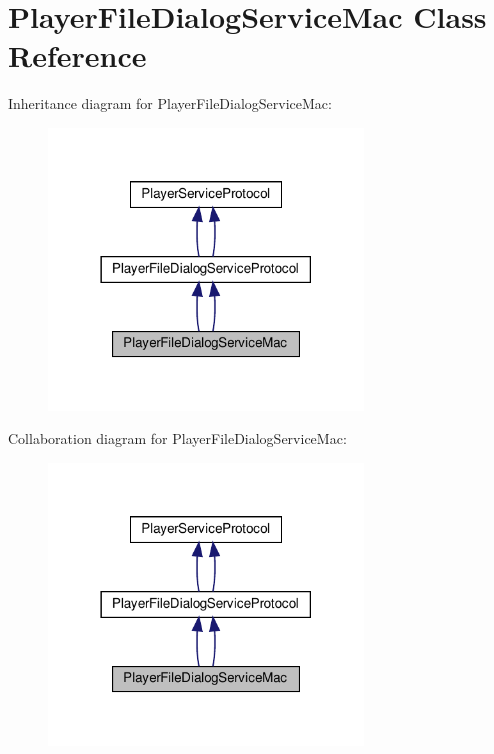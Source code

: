 \hypertarget{classPlayerFileDialogServiceMac}{}\section{Player\+File\+Dialog\+Service\+Mac Class Reference}
\label{classPlayerFileDialogServiceMac}


Inheritance diagram for Player\+File\+Dialog\+Service\+Mac\+:
\nopagebreak
\begin{figure}[H]
\begin{center}
\leavevmode
\includegraphics[width=237pt]{classPlayerFileDialogServiceMac__inherit__graph}
\end{center}
\end{figure}


Collaboration diagram for Player\+File\+Dialog\+Service\+Mac\+:
\nopagebreak
\begin{figure}[H]
\begin{center}
\leavevmode
\includegraphics[width=237pt]{classPlayerFileDialogServiceMac__coll__graph}
\end{center}
\end{figure}
